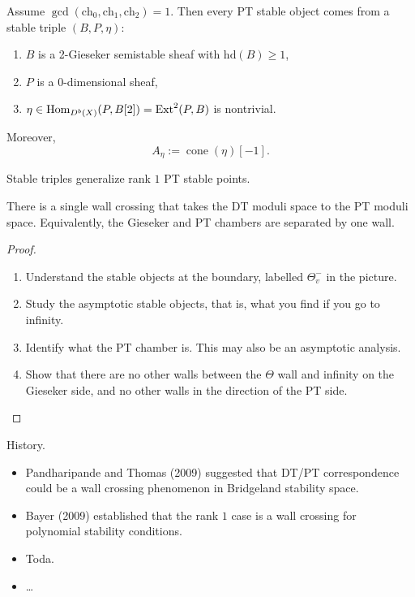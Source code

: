 \begin{definition}[PT stability]
\label{definition-pt-stability}
\end{definition}

\begin{theorem}
\label{theorem-pt-stable-triple}
Assume $\gcd(\mathrm{ch}_0,
\mathrm{ch}_1,\mathrm{ch}_2)=1$.
Then every PT stable object comes from
a stable triple $(B,P,\eta)$:
\begin{enumerate}
\item $B$ is a 2-Gieseker
      semistable sheaf with
      $\mathrm{hd}(B)\geq 1$,
\item $P$ is a $0$-dimensional sheaf,
\item $\eta \in
      \mathop{\mathrm{Hom}}\nolimits_{D^b(X)}(P,B[2])=
      \mathop{\mathrm{Ext}}\nolimits^2(P,B)$ is nontrivial.
\end{enumerate}
Moreover,
$$
A_\eta := \operatorname{cone}(\eta)[-1].
$$
\end{theorem}

\begin{remark}
\label{remark-wall-crossing-triples}
Stable triples generalize rank $1$
PT stable points.
\end{remark}

\begin{theorem}[Jardim et al.]
\label{theorem-single-wall-crossing}
There is a single wall crossing
that takes the DT moduli space to
the PT moduli space.
Equivalently, the Gieseker and PT
chambers are separated by one wall.
\end{theorem}

\begin{proof}
\begin{enumerate}
\item Understand the stable
objects at the boundary,
labelled $\Theta_v^-$
in the picture.
\item Study the asymptotic stable
objects, that is,
what you find if you go to
infinity.
\item Identify what the PT
chamber is.
This may also be an asymptotic
analysis.
\item Show that there are no other
walls between the $\Theta$ wall
and infinity on the Gieseker side,
and no other walls in the
direction of the PT side.
\end{enumerate}
\end{proof}

\medskip\noindent
History.
\begin{itemize}
\item Pandharipande and Thomas
(2009) suggested that DT/PT
correspondence could be a wall
crossing phenomenon in
Bridgeland stability space.
\item Bayer (2009) established
that the rank $1$ case is a
wall crossing for polynomial
stability conditions.
\item Toda.
\item \dots
\end{itemize}

